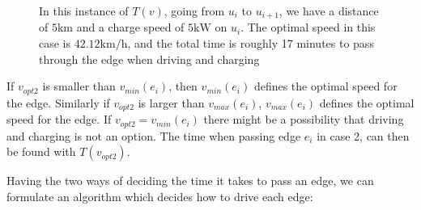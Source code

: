 \begin{figure}[!htb]
\label{fig:graph}
% 
\caption{In this instance of $T(v)$, going from $u_i$ to $u_{i+1}$, we have a distance of $5 \si{\km}$ and a charge speed of $5 \si{\kW}$ on $u_i$. The optimal speed in this case is $42.12\si{\km\per\hour}$, and the total time is roughly 17 minutes to pass through the edge when driving and charging}
\label{fig:graph}
\end{figure}

If $v_{opt2}$ is smaller than $v_{min}(e_i)$, then $v_{min}(e_i)$ defines the optimal speed for the edge. Similarly if $v_{opt2}$ is larger than $v_{max}(e_i)$, $v_{max}(e_i)$ defines the optimal speed for the edge. If $v_{opt2} = v_{min}(e_i)$ there might be a possibility that driving and charging is not an option. The time when passing edge $e_i$ in case 2, can then be found with $T(v_{opt2})$.

Having the two ways of deciding the time it takes to pass an edge, we can formulate an algorithm which decides how to drive each edge:

